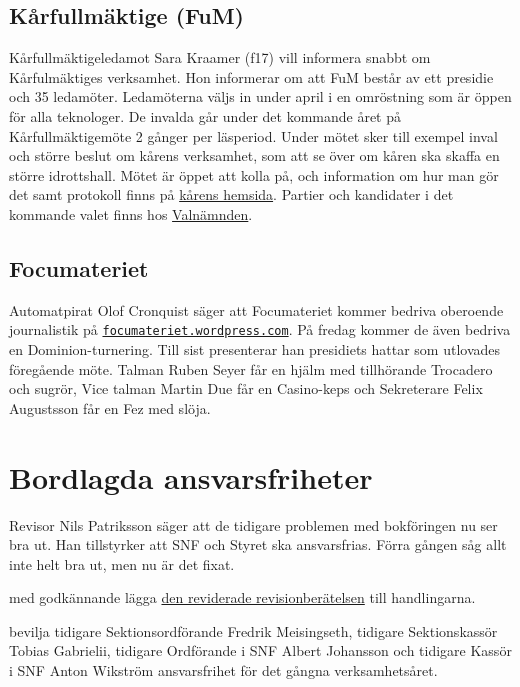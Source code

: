 \documentclass[hidelinks]{sektionsmote} %
\begin{document}
\subsection{Kårfullmäktige (FuM)}
Kårfullmäktigeledamot Sara Kraamer (f17) vill informera snabbt om Kårfulmäktiges verksamhet.
Hon informerar om att FuM består av ett presidie och 35 ledamöter.
Ledamöterna väljs in under april i en omröstning som är öppen för alla teknologer.
De invalda går under det kommande året på Kårfullmäktigemöte 2 gånger per läsperiod.
Under mötet sker till exempel inval och större beslut om kårens verksamhet, som att se över om kåren ska skaffa en större idrottshall.
Mötet är öppet att kolla på, och information om hur man gör det samt protokoll finns på \href{https://chalmersstudentkar.se/union-council/}{kårens hemsida}.
Partier och kandidater i det kommande valet finns hos \href{https://www.facebook.com/fumval/}{Valnämnden}.

\subsection{Focumateriet}
Automatpirat Olof Cronquist säger att Focumateriet kommer bedriva oberoende journalistik på \newline\href{https://focumateriet.wordpress.com}{\texttt{focumateriet.wordpress.com}}.
På fredag kommer de även bedriva en Dominion-turnering.
Till sist presenterar han presidiets hattar som utlovades föregående möte.
Talman Ruben Seyer får en hjälm med tillhörande Trocadero och sugrör, Vice talman Martin Due får en Casino-keps och Sekreterare Felix Augustsson får en Fez med slöja.


\section{Bordlagda ansvarsfriheter}
Revisor Nils Patriksson säger att de tidigare problemen med bokföringen nu ser bra ut.
Han tillstyrker att SNF och Styret ska ansvarsfrias.
Förra gången såg allt inte helt bra ut, men nu är det fixat.
\begin{beslut}
  \item med godkännande lägga \hyperlink{bilagor/revisionsnf1920.pdf.1}{den reviderade revisionberätelsen} till handlingarna.
  \item bevilja tidigare Sektionsordförande Fredrik Meisingseth, tidigare Sektionskassör Tobias Gabrielii, tidigare Ordförande i SNF Albert Johansson och tidigare Kassör i SNF Anton Wikström ansvarsfrihet för det gångna verksamhetsåret.
\end{beslut}
\end{document}
